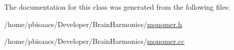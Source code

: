 The documentation for this class was generated from the following files\+:\begin{DoxyCompactItemize}
\item 
/home/pbisaacs/\+Developer/\+Brain\+Harmonics/\mbox{\hyperlink{monomer_8h}{monomer.\+h}}\item 
/home/pbisaacs/\+Developer/\+Brain\+Harmonics/\mbox{\hyperlink{monomer_8cc}{monomer.\+cc}}\end{DoxyCompactItemize}
